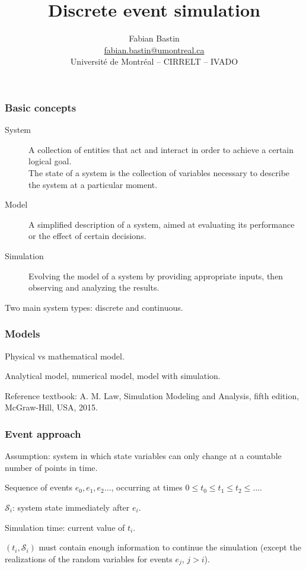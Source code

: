 \documentclass[t,usepdftitle=false,aspectratio=169]{beamer}
\title[Simulation]{Discrete event simulation}
\author[Fabian Bastin]{Fabian Bastin \\ \url{fabian.bastin@umontreal.ca} \\ Université de Montréal -- CIRRELT -- IVADO}
\date{}
\def\cS{\mathcal{S}}
\begin{document}
\frame{\titlepage}

\begin{frame}
	\frametitle{Basic concepts}
	
	\begin{description}
		\item[System]
		A collection of entities that act and interact in order to achieve a certain logical goal.\\
		The state of a system is the collection of variables necessary to describe the system at a particular moment.
		\item[Model]
		A simplified description of a system, aimed at evaluating its performance or the effect of certain decisions.
		\item[Simulation]
		Evolving the model of a system by providing appropriate inputs, then observing and analyzing the results.
	\end{description}
	
	\mbox{}
	
	Two main system types: discrete and continuous.
	
\end{frame}

\begin{frame}
	\frametitle{Models}
	
	Physical vs mathematical model.
	
	\mbox{}
	
	Analytical model, numerical model, model with simulation.

\mbox{}

Reference textbook: 
A. M. Law, Simulation Modeling and Analysis, fifth edition, McGraw-Hill, USA, 2015.

\end{frame}

\begin{frame}
\frametitle{Event approach}

Assumption: system in which state variables can only change at a countable number of points in time.

\mbox{}

Sequence of events $e_0, e_1, e_2\ldots$, occurring at times $0 \leq t_0 \leq t_1 \leq t_2 \leq \ldots$. 

\mbox{}

${\cS_i}$: system state immediately after ${e_i}$.

\mbox{}

Simulation time: current value of ${t_i}$.

\mbox{}

$(t_i,\cS_i)$ must contain enough information to continue the simulation (except the realizations of the random variables for events $e_j$, $j > i$).

\end{frame}
\end{document}
